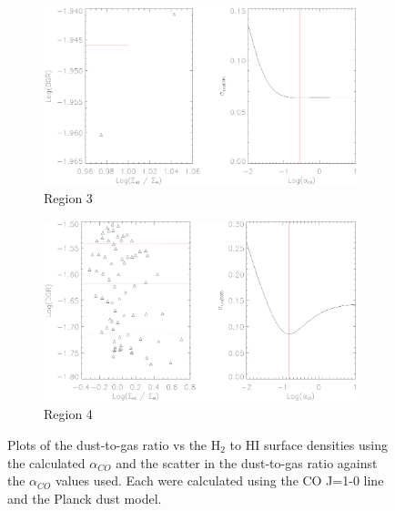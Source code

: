 \begin{figure}  
  \ContinuedFloat
  \begin{subfigure}[t]{1\textwidth}
    \centering
    \includegraphics[width=1.\textwidth]{dgr_imgs/region_3_aco_output_10.eps}
    \caption{Region 3}
    \label{fig:dgr_co10_3}
  \end{subfigure}

  \begin{subfigure}[t]{1\textwidth}
    \centering
    \includegraphics[width=1.\textwidth]{dgr_imgs/region_4_aco_output_10.eps}
    \caption{Region 4}
  \end{subfigure}
   \caption[Dust-to-Gas Ratio Determination Plots for CO J=1-0]{Plots of the dust-to-gas ratio vs the H$_2$ to HI surface densities using the calculated $\alpha_{CO}$ and the scatter in the dust-to-gas ratio against the $\alpha_{CO}$ values used.  Each were calculated using the CO J=1-0 line and the Planck dust model.}
   \label{fig:dgr_co10}
\end{figure}

